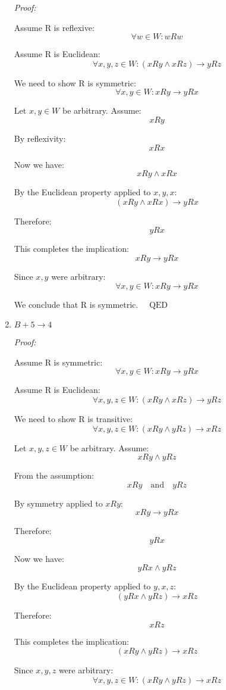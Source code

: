 \documentclass[12pt,a4paper,openany]{article}
\begin{document}
\begin{enumerate}
    \textit{Proof:}
    
    Assume R is reflexive:
    $$\forall w \in W: wRw$$
    
    Assume R is Euclidean:
    $$\forall x, y, z \in W: (xRy \land xRz) \to yRz$$
    
    We need to show R is symmetric:
    $$\forall x, y \in W: xRy \to yRx$$
    
    Let $x, y \in W$ be arbitrary. Assume:
    $$xRy$$
    
    By reflexivity:
    $$xRx$$
    
    Now we have:
    $$xRy \land xRx$$
    
    By the Euclidean property applied to $x, y, x$:
    $$(xRy \land xRx) \to yRx$$
    
    Therefore:
    $$yRx$$
    
    This completes the implication:
    $$xRy \to yRx$$
    
    Since $x, y$ were arbitrary:
    $$\forall x, y \in W: xRy \to yRx$$
    
    We conclude that R is symmetric. $\quad \text{QED}$
    
    \item \textbf{$B + 5 \to 4$}
    
    \textit{Proof:}
    
    Assume R is symmetric:
    $$\forall x, y \in W: xRy \to yRx$$
    
    Assume R is Euclidean:
    $$\forall x, y, z \in W: (xRy \land xRz) \to yRz$$
    
    We need to show R is transitive:
    $$\forall x, y, z \in W: (xRy \land yRz) \to xRz$$
    
    Let $x, y, z \in W$ be arbitrary. Assume:
    $$xRy \land yRz$$
    
    From the assumption:
    $$xRy \quad \text{and} \quad yRz$$
    
    By symmetry applied to $xRy$:
    $$xRy \to yRx$$
    
    Therefore:
    $$yRx$$
    
    Now we have:
    $$yRx \land yRz$$
    
    By the Euclidean property applied to $y, x, z$:
    $$(yRx \land yRz) \to xRz$$
    
    Therefore:
    $$xRz$$
    
    This completes the implication:
    $$(xRy \land yRz) \to xRz$$
    
    Since $x, y, z$ were arbitrary:
    $$\forall x, y, z \in W: (xRy \land yRz) \to xRz$$
    

\end{enumerate}
\end{document}
